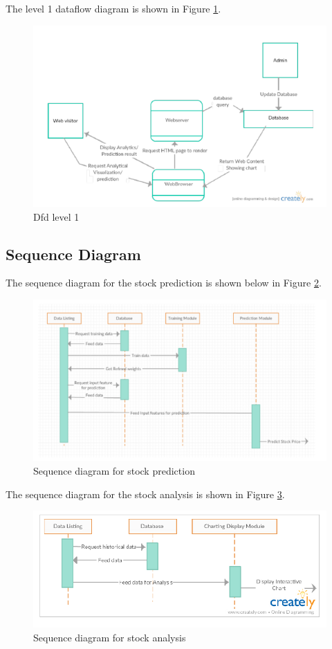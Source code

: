 The level 1 dataflow diagram is shown in Figure \ref{fig:dfd1}.

\begin{figure}[h!]
  \includegraphics[width=6in]{fig/dfd1}
  \caption{Dfd level 1 }\label{fig:dfd1}
\end{figure}

\newpage
\subsection{Sequence Diagram}
The sequence diagram for the stock prediction is shown below in Figure \ref{fig:sequence}.

\begin{figure}[h!]
  \includegraphics[width=\textwidth]{fig/sequence}
  \caption{Sequence diagram for stock prediction }\label{fig:sequence}
\end{figure}


The sequence diagram for the stock analysis is shown in Figure \ref{fig:sequencevis}.

\begin{figure}[h!]
  \includegraphics[width=\textwidth]{fig/sequencevis}
  \caption{Sequence diagram for stock analysis }\label{fig:sequencevis}
\end{figure}

